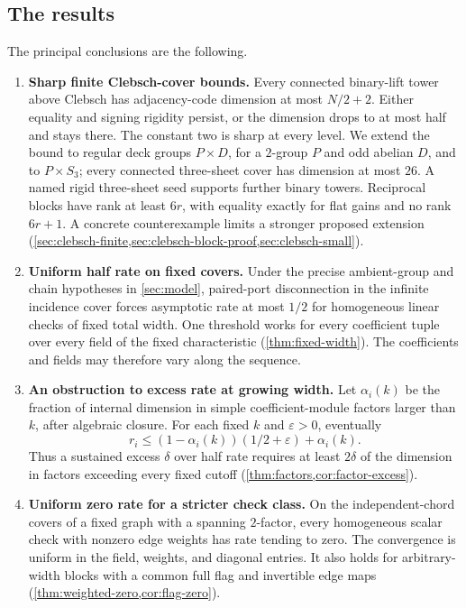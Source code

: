 \subsection{The results}
The principal conclusions are the following.
\begin{enumerate}[label=\textup{(\arabic*)}]
\item \textbf{Sharp finite Clebsch-cover bounds.}
Every connected binary-lift tower above Clebsch has adjacency-code
dimension at most $N/2+2$. Either equality and signing rigidity persist,
or the dimension drops to at most half and stays there. The constant
two is sharp at every level. We extend the bound to regular deck groups
$P\times D$, for a $2$-group $P$ and odd abelian $D$, and to
$P\times S_3$; every connected three-sheet cover has dimension at most
$26$. A named rigid three-sheet seed supports further binary towers.
Reciprocal blocks have rank at least $6r$, with equality exactly for
flat gains and no rank $6r+1$. A concrete counterexample limits a
stronger proposed extension
(\cref{sec:clebsch-finite,sec:clebsch-block-proof,sec:clebsch-small}).
\item \textbf{Uniform half rate on fixed covers.}
Under the precise ambient-group and chain hypotheses in
\cref{sec:model}, paired-port disconnection in the infinite incidence
cover forces asymptotic rate at most $1/2$ for homogeneous linear checks
of fixed total width. One threshold works for every coefficient tuple
over every field of the fixed characteristic
(\cref{thm:fixed-width}). The coefficients and fields may therefore vary
along the sequence.
\item \textbf{An obstruction to excess rate at growing width.}
Let $\alpha_i(k)$ be the fraction of internal dimension in simple
coefficient-module factors larger than $k$, after algebraic closure.
For each fixed $k$ and $\varepsilon>0$, eventually
\[
 r_i\le(1-\alpha_i(k))(1/2+\varepsilon)+\alpha_i(k).
\]
Thus a sustained excess $\delta$ over half rate requires at least
$2\delta$ of the dimension in factors exceeding every fixed cutoff
(\cref{thm:factors,cor:factor-excess}).
\item \textbf{Uniform zero rate for a stricter check class.}
On the independent-chord covers of a fixed graph with a spanning
$2$-factor, every homogeneous scalar check with nonzero edge weights
has rate tending to zero. The convergence is uniform in the field,
weights, and diagonal entries. It also holds for arbitrary-width
blocks with a common full flag and invertible edge maps
(\cref{thm:weighted-zero,cor:flag-zero}).

\end{enumerate}
